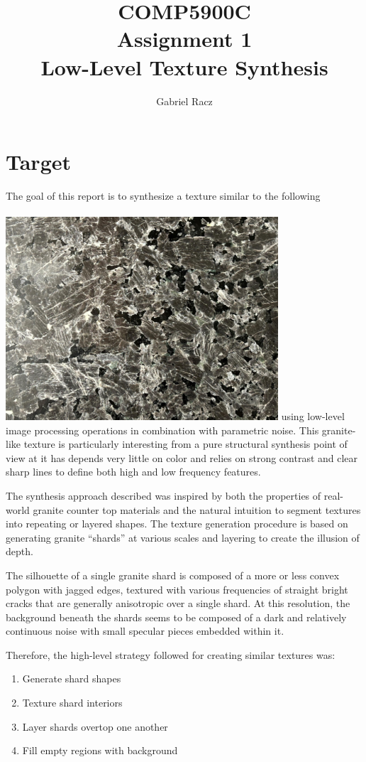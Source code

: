 \documentclass[a4paper, 11pt, titlepage]{article}
\title{COMP5900C\\
Assignment 1\\
Low-Level Texture Synthesis}
\author{Gabriel Racz}
\begin{document}
\maketitle
\section{Target}
The goal of this report is to synthesize a texture similar to the following\\\\
 {
    \includegraphics[width=4.0in]{images/sample.png}
}
using low-level image processing operations in combination with parametric noise.
This granite-like texture is particularly interesting from a pure structural
synthesis point of view at it has depends very little on color and relies on
strong contrast and clear sharp lines to define both high and low frequency
features.

The synthesis approach described was inspired by both the properties of real-world granite
counter top materials and the natural intuition to segment textures into
repeating or layered shapes. The texture generation procedure is based on
generating granite ``shards'' at various scales and layering to create the
illusion of depth. 

The silhouette of a single granite shard is composed of a more or less convex
polygon with jagged edges, textured with various frequencies of straight bright
cracks that are generally anisotropic over a single shard. At this resolution,
the background beneath the shards seems to be composed of a dark and relatively
continuous noise with small specular pieces embedded within it.

Therefore, the high-level strategy followed for creating similar textures was:
\begin{enumerate}
    \item Generate shard shapes
    \item Texture shard interiors
    \item Layer shards overtop one another
    \item Fill empty regions with background
\end{enumerate}
\end{document}
